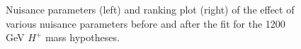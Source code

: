 \begin{figure}[H]
  \centering
  \caption{Nuisance parameters (left) and ranking plot (right) of the effect of various nuisance parameters before and after the fit for the 1200 GeV $H^{+}$ mass hypotheses.}
\end{figure}
